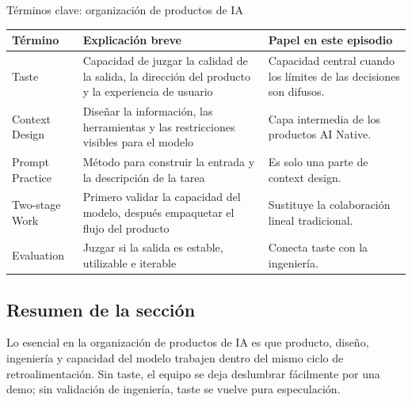 \begin{knowledgebox}{Términos clave: organización de productos de IA}
\begin{tabularx}{\textwidth}{p{}p{}X}
\toprule
Término & Explicación breve & Papel en este episodio \\
\midrule
Taste & Capacidad de juzgar la calidad de la salida, la dirección del producto y la experiencia de usuario & Capacidad central cuando los límites de las decisiones son difusos. \\
Context Design & Diseñar la información, las herramientas y las restricciones visibles para el modelo & Capa intermedia de los productos AI Native. \\
Prompt Practice & Método para construir la entrada y la descripción de la tarea & Es solo una parte de context design. \\
Two-stage Work & Primero validar la capacidad del modelo, después empaquetar el flujo del producto & Sustituye la colaboración lineal tradicional. \\
Evaluation & Juzgar si la salida es estable, utilizable e iterable & Conecta taste con la ingeniería. \\
\bottomrule
\end{tabularx}
\end{knowledgebox}

\subsection{Resumen de la sección}

Lo esencial en la organización de productos de IA es que producto, diseño, ingeniería y capacidad del modelo trabajen dentro del mismo ciclo de retroalimentación. Sin taste, el equipo se deja deslumbrar fácilmente por una demo; sin validación de ingeniería, taste se vuelve pura especulación.
